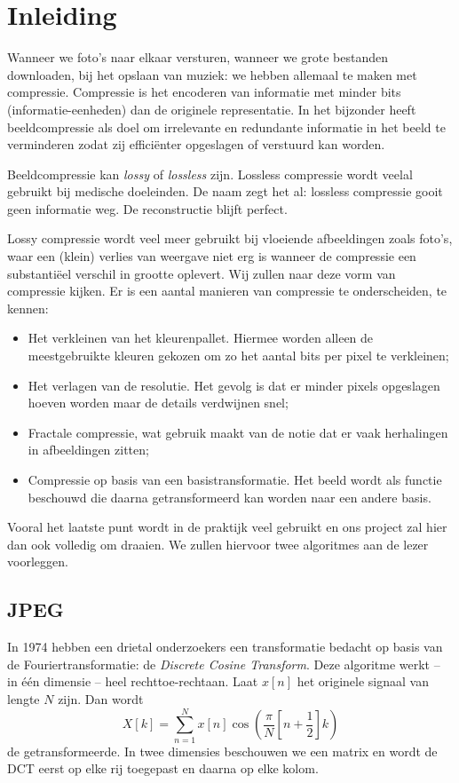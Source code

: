 \documentclass[11pt]{uvamath}
\theoremstyle{plain}
\theoremstyle{definition}
\theoremstyle{remark}
\begin{document}
\tableofcontents
\newpage

\chapter*{Inleiding}
Wanneer we foto's naar elkaar versturen, wanneer we grote bestanden downloaden, bij het opslaan van muziek: we hebben allemaal te maken met compressie. Compressie is het encoderen van informatie met minder bits (informatie-eenheden) dan de originele representatie. In het bijzonder heeft beeldcompressie als doel om irrelevante en redundante informatie in het beeld te verminderen zodat zij effici\"enter opgeslagen of verstuurd kan worden.

Beeldcompressie kan \emph{lossy} of \emph{lossless} zijn. Lossless compressie wordt veelal gebruikt bij medische doeleinden. De naam zegt het al: lossless compressie gooit geen informatie weg. De reconstructie blijft perfect.

Lossy compressie wordt veel meer gebruikt bij vloeiende afbeeldingen zoals foto's, waar een (klein) verlies van weergave niet erg is wanneer de compressie een substanti\"eel verschil in grootte oplevert. 
Wij zullen naar deze vorm van compressie kijken. Er is een aantal manieren van compressie te onderscheiden, te kennen:
\begin{itemize}
	\item Het verkleinen van het kleurenpallet. Hiermee worden alleen de meestgebruikte kleuren gekozen om zo het aantal bits per pixel te verkleinen;
	\item Het verlagen van de resolutie. Het gevolg is dat er minder pixels opgeslagen hoeven worden maar de details verdwijnen snel;
	\item Fractale compressie, wat gebruik maakt van de notie dat er vaak herhalingen in afbeeldingen zitten;
	\item Compressie op basis van een basistransformatie. Het beeld wordt als functie beschouwd die daarna getransformeerd kan worden naar een andere basis.
\end{itemize}
Vooral het laatste punt wordt in de praktijk veel gebruikt en ons project zal hier dan ook volledig om draaien.
We zullen hiervoor twee algoritmes aan de lezer voorleggen.

\section*{JPEG}
In 1974 hebben een drietal onderzoekers een transformatie bedacht op basis van de Fouriertransformatie: de \emph{Discrete Cosine Transform}. Deze algoritme werkt -- in \'e\'en dimensie -- heel rechttoe-rechtaan. Laat $x[n]$ het originele signaal van lengte $N$ zijn. Dan wordt
\[
	X[k] = \sum_{n=1}^N x[n] \cos\left(\frac{\pi}{N}\left[ n + \frac{1}{2}\right]k\right)
\]
de getransformeerde. In twee dimensies beschouwen we een matrix en wordt de DCT eerst op elke rij toegepast en daarna op elke kolom.
\end{document}
